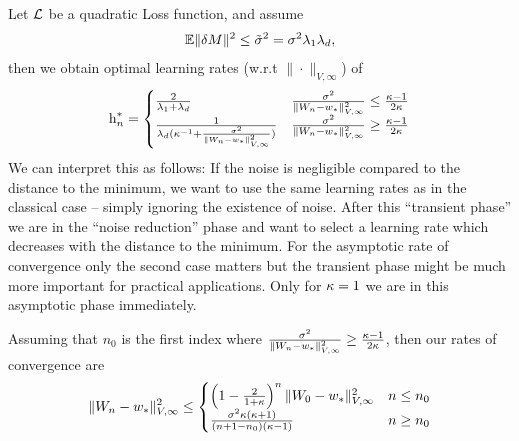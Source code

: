 \begin{theorem}
	Let \(\mathcal{L}\) be a quadratic Loss function, and assume
	\begin{align*}
		\mathbb{E}\|\delta M\|^2
		\le \tilde{\sigma}^2 = \sigma^2 \lambda_1\lambda_d,
	\end{align*}
	then we obtain optimal learning rates (w.r.t \(\|\cdot\|_{V,\infty}\)) of
	\begin{align*}
		\text{h}_n^*
		= \begin{cases}
			\frac{2}{\lambda_1+\lambda_d}
			& \frac{\sigma^2}{\|W_n - w_*\|_{V,\infty}^2}
			\le \frac{\kappa-1}{2\kappa} \\
			\frac1{\lambda_d(\kappa^{-1} + \frac{\sigma^2}{\|W_n-w_*\|_{V,\infty}^2})}
			& \frac{\sigma^2}{\|W_n - w_*\|_{V,\infty}^2}
			\ge \frac{\kappa-1}{2\kappa}
		\end{cases}
	\end{align*}
	We can interpret this as follows: If the noise is negligible compared to the
	distance to the minimum, we want to use the same learning rates as in the
	classical case -- simply ignoring the existence of noise. After this ``transient
	phase'' we are in the ``noise reduction'' phase and want to select a learning rate
	which decreases with the distance to the minimum. For the asymptotic rate of
	convergence only the second case matters but the transient phase might be much
	more important for practical applications. Only for \(\kappa=1\) we are
	in this asymptotic phase immediately.
	
	Assuming that \(n_0\) is the first index where
	\(\frac{\sigma^2}{\|W_n - w_*\|_{V,\infty}^2} \ge
	\frac{\kappa-1}{2\kappa}\),
	then our rates of convergence are
	\begin{align*}
		\|W_n-w_*\|_{V,\infty}^2
		\le \begin{cases}
			\left(1-\tfrac{2}{1+\kappa}\right)^n\|W_0-w_*\|_{V,\infty}^2
			& n \le n_0\\
			\frac{\sigma^2\kappa(\kappa+1)}{(n+1-n_0)(\kappa-1)}
			& n \ge n_0
		\end{cases}
	\end{align*}
\end{theorem}
